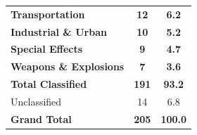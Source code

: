 \begin{table}[h!]
\begin{tabularx}{\linewidth}{l S[table-format=2.0] S[table-format=2.1]}
        \addlinespace
        
        \textbf{Transportation} & \textbf{12} & \textbf{6.2} \\
        
        \addlinespace
        
        \textbf{Industrial \& Urban} & \textbf{10} & \textbf{5.2} \\
        
        \addlinespace
        
        \textbf{Special Effects} & \textbf{9} & \textbf{4.7} \\
        
        \addlinespace
        
        \textbf{Weapons \& Explosions} & \textbf{7} & \textbf{3.6} \\

        \midrule
        
        \textbf{Total Classified} & \textbf{191} & \textbf{93.2} \\
        Unclassified & 14 & 6.8 \\
        \midrule
        \textbf{Grand Total} & \textbf{205} & \textbf{100.0} \\
        
        \bottomrule
    \end{tabularx}
\end{table}

